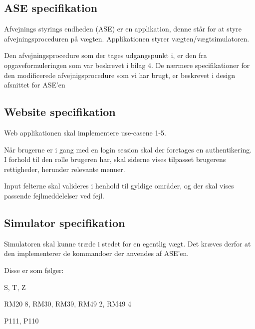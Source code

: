 \documentclass[a4paper]{article}
\newenvironment{my_itemize}
{\begin{itemize}
  \setlength{\itemsep}{1pt}
  \setlength{\parskip}{0pt}
  \setlength{\parsep}{0pt}}
{\end{itemize}}
\begin{document}
\subsection{ASE specifikation} %

Afvejnings styrings endheden (ASE) er en applikation, denne står for at styre afvejningsproceduren på vægten. Applikationen styrer vægten/vægtsimulatoren. 

Den afvejningsprocedure som der tages udgangspunkt i, er den fra opgaveformuleringen som var beskrevet i bilag 4. De nærmere specifikationer for den modificerede afvejnigsprocedure som vi har brugt, er beskrevet i design afsnittet for ASE'en


\subsection{Website specifikation} %

Web applikationen skal implementere use-casene 1-5.

Når brugerne er i gang med en login session skal der foretages en authentikering. I forhold til den rolle brugeren har, skal siderne vises tilpasset brugerens rettigheder, herunder relevante menuer.

Input felterne skal valideres i henhold til gyldige områder, og der skal vises passende fejlmeddelelser ved fejl.


\subsection{Simulator specifikation} %

Simulatoren skal kunne træde i stedet for en egentlig vægt. Det kræves derfor at den implementerer de kommandoer der anvendes af ASE'en.

Disse er som følger:

\begin{my_itemize}
  \item S, T, Z
  \item RM20 8, RM30, RM39, RM49 2, RM49 4
  \item P111, P110
\end{my_itemize}


\clearpage
\end{document}
